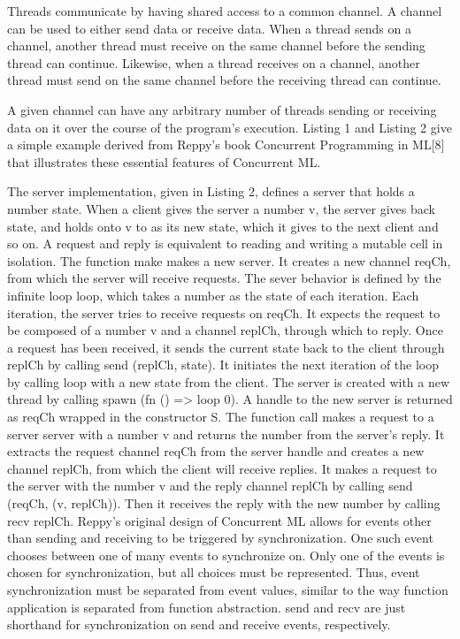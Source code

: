 \documentclass{article}
\begin{document}
  Threads communicate by having shared access to a common channel.  A channel can be used to either send data or receive data.  When a thread sends on a channel, another thread must receive on the same channel before the sending thread can continue.  Likewise, when a thread receives on a channel, another thread must send on the same channel before the receiving thread can continue.


  A given channel can have any arbitrary number of threads sending or receiving data on it over the course of the program's execution.  Listing 1 and Listing 2 give a simple example derived from Reppy's book Concurrent Programming in ML[8] that illustrates these essential features of Concurrent ML.


  The server implementation, given in Listing 2, defines a server that holds a number state.  When a client gives the server a number v, the server gives back state, and holds onto v to as its new state, which it gives to the next client and so on.  A request and reply is equivalent to reading and writing a mutable cell in isolation.  The function make makes a new server.  It creates a new channel reqCh, from which the server will receive requests.  The sever behavior is defined by the infinite loop loop, which takes a number as the state of each iteration.  Each iteration, the server tries to receive requests on reqCh.  It expects the request to be composed of a number v and a channel replCh, through which to reply.  Once a request has been received, it sends the current state back to the client through replCh by calling send (replCh, state).  It initiates the next iteration of the loop by calling loop with a new state from the client.  The server is created with a new thread by calling  spawn (fn () => loop 0).   A handle to the new server is returned as reqCh wrapped in the constructor S.  The function call makes a request to a server server with a number v and returns the number from the server's reply.  It extracts the request channel reqCh from the server handle and creates a new channel replCh, from which the client will receive replies.  It makes a request to the server with the number v and the reply channel replCh by calling send (reqCh, (v, replCh)).  Then it receives the reply with the new number by calling recv replCh.
	Reppy's original design of Concurrent ML allows for events other than sending and receiving to be triggered by synchronization.  One such event chooses between one of many events to synchronize on.  Only one of the events is chosen for synchronization, but all choices must be represented.  Thus, event synchronization must be separated from event values, similar to the way function application is separated from function abstraction.  send and recv are just shorthand for synchronization on send and receive events, respectively.
\end{document}
